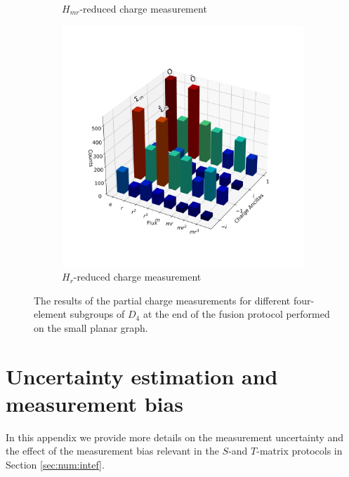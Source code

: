 \documentclass[a4paper,twocolumn,11pt, accepted=2024-06-14]{quantumarticle}
\begin{document}
\begin{figure}
\begin{subfigure}{0.49\linewidth}
        \caption{$H_{mr}$-reduced charge measurement}
        \label{fig:basket_Hmr}
    \end{subfigure}
    \begin{subfigure}{0.5\linewidth}
        \centering
        \includegraphics[width=\linewidth]{Figures/basket_r.png}
        \caption{$H_r$-reduced charge measurement}
        \label{fig:basket_Hr}
    \end{subfigure}
    \caption{The results of the partial charge measurements for different four-element subgroups of $D_4$ at the end of the fusion protocol performed on the small planar graph.}
    \label{fig:basket_all_subs}
\end{figure}

\section{Uncertainty estimation and measurement bias}
In this appendix we provide more details on the measurement uncertainty and the effect of the measurement bias relevant in the $S$-and $T$-matrix protocols in Section \ref{sec:num:intef}.
\end{document}
